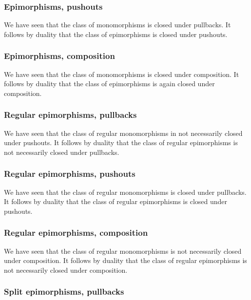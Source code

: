 \subsubsection*{Epimorphisms, pushouts}

We have seen that the class of monomorphisms is closed under pullbacks.
It follows by duality that the class of epimorphisms is closed under pushouts.



\subsubsection*{Epimorphisms, composition}

We have seen that the class of monomorphisms is closed under composition.
It follows by duality that the class of epimorphisms is again closed under composition.



\subsubsection*{Regular epimorphisms, pullbacks}

We have seen that the class of regular monomorphisms in not necessarily closed under pushouts.
It follows by duality that the class of regular epimorphisms is not necessarily closed under pullbacks.



\subsubsection*{Regular epimorphisms, pushouts}

We have seen that the class of regular monomorphisms is closed under pullbacks.
It follows by duality that the class of regular epimorphisms is closed under pushouts.



\subsubsection*{Regular epimorphisms, composition}

We have seen that the class of regular monomorphisms is not necessarily closed under composition.
It follows by duality that the class of regular epimorphisms is not necessarily closed under composition.



\subsubsection*{Split epimorphisms, pullbacks}


